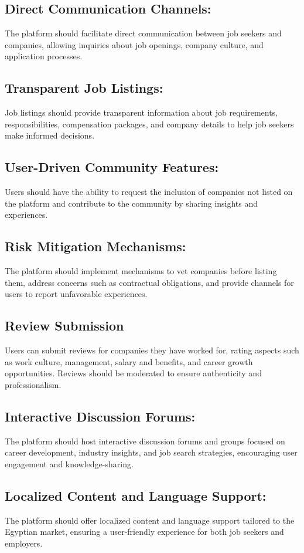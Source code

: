 \documentclass[titlepage]{article}
\begin{document}
\subsection{Direct Communication Channels:}
The platform should facilitate direct communication between job seekers and companies, allowing inquiries about job openings, company culture, and application processes.

\subsection{Transparent Job Listings:}
Job listings should provide transparent information about job requirements, responsibilities, compensation packages, and company details to help job seekers make informed decisions.

\subsection{User-Driven Community Features:}
Users should have the ability to request the inclusion of companies not listed on the platform and contribute to the community by sharing insights and experiences.

\subsection{Risk Mitigation Mechanisms:}
The platform should implement mechanisms to vet companies before listing them, address concerns such as contractual obligations, and provide channels for users to report unfavorable experiences.

\subsection{Review Submission}
Users can submit reviews for companies they have worked for, rating aspects such as work culture, management, salary and benefits, and career growth opportunities. Reviews should be moderated to ensure authenticity and professionalism.

\subsection{Interactive Discussion Forums:}
The platform should host interactive discussion forums and groups focused on career development, industry insights, and job search strategies, encouraging user engagement and knowledge-sharing.

\subsection{Localized Content and Language Support:}
The platform should offer localized content and language support tailored to the Egyptian market, ensuring a user-friendly experience for both job seekers and employers.
\end{document}
